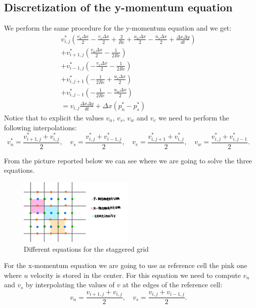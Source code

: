 \documentclass{article}
\begin{document}
\subsection*{Discretization of the y-momentum equation}
We perform the same procedure for the y-momentum equation and we get:
\begin{gather*}
    v_{i,j}^* \left(\frac{v_n \Delta x}{2} - \frac{v_s \Delta x}{2} + \frac{2}{Re} + \frac{u_n \Delta x}{2} - \frac{u_s \Delta x}{2} + \frac{\Delta x \Delta y}{dt} \right) \\
    + v_{i+1,j}^* \left(\frac{v_n \Delta x}{2} - \frac{1}{2 Re} \right) \\
    + v_{i-1,j}^* \left(- \frac{v_s \Delta x}{2} - \frac{1}{2 Re} \right) \\
    + v_{i,j+1}^* \left(- \frac{1}{2 Re} + \frac{u_e \Delta x}{2} \right) \\
    + v_{i,j-1}^* \left(- \frac{1}{2 Re} - \frac{u_w \Delta x}{2} \right) \\
    = v_{i,j} \frac{ \Delta x \Delta y}{dt} + \Delta x (p_{n}^* - p_{s}^*)
\end{gather*}
Notice that to explicit the values $v_n$, $v_s$, $v_w$ and $v_e$ we need to perform the following interpolations:
\begin{equation*}
  v_n^* = \frac{v_{i+1,j}^* + v_{i,j}^*}{2}, \quad v_s = \frac{v_{i,j}^* + v_{i-1,j}^*}{2}, \quad v_e = \frac{v_{i,j+1}^* + v_{i,j}^*}{2}, \quad v_w = \frac{v_{i,j}^* + v_{i,j-1}^*}{2}.
\end{equation*}

From the picture reported below we can see where we are going to solve the three equations.
\begin{figure}[h!]
  \centering
  \includegraphics[width=0.5\textwidth]{equations_grid.jpg}
  \caption{Different equations for the staggered grid}
  \label{equations_grid}
\end{figure}
For the x-momentum equation we are going to use as reference cell the pink one where $u$ velocity is stored in the center.
For this equation we need to compute $v_n$ and $v_s$ by interpolating the values of $v$ at the edges of the reference cell:
\begin{equation*}
  v_n = \frac{v_{i+1,j} + v_{i,j}}{2}, \quad v_s = \frac{v_{i,j} + v_{i-1,j}}{2}.
\end{equation*}
\end{document}
